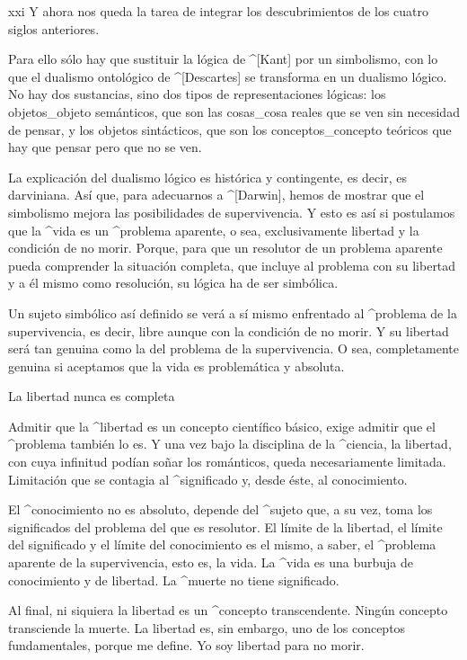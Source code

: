 \vfill\break

\siglo xxi Y ahora nos queda la tarea de integrar los
descubrimientos de los cuatro siglos anteriores.

\noindent
Para ello sólo hay que sustituir la lógica de ^[Kant] por un simbolismo,
con lo que el dualismo ontológico de ^[Descartes] se transforma en un
dualismo lógico. No hay dos sustancias, sino dos tipos de
representaciones lógicas: los objetos_{objeto} semánticos, que son las
cosas_{cosa} reales que se ven sin necesidad de pensar, y los objetos
sintácticos, que son los conceptos_{concepto} teóricos que hay que
pensar pero que no se ven.

La explicación del dualismo lógico es histórica y contingente, es decir,
es darviniana. Así que, para adecuarnos a ^[Darwin], hemos de mostrar
que el simbolismo mejora las posibilidades de supervivencia. Y esto es
así si postulamos que la ^{vida} es un ^{problema aparente}, o sea,
exclusivamente libertad y la condición de no morir. Porque, para que un
resolutor de un problema aparente pueda comprender la situación
completa, que incluye al problema con su libertad y a él mismo como
resolución, su lógica ha de ser simbólica.

Un sujeto simbólico así definido se verá a sí mismo enfrentado al
^{problema de la supervivencia}, es decir, libre aunque con la condición
de no morir. Y su libertad será tan genuina como la del problema de la
supervivencia. O sea, completamente genuina si aceptamos que la vida es
problemática y absoluta.


\Section La libertad nunca es completa

Admitir que la ^{libertad} es un concepto científico básico, exige
admitir que el ^{problema} también lo es. Y una vez bajo la disciplina
de la ^{ciencia}, la libertad, con cuya infinitud podían soñar los
románticos, queda necesariamente limitada. Limitación que se contagia al
^{significado} y, desde éste, al conocimiento.

El ^{conocimiento} no es absoluto, depende del ^{sujeto} que, a su vez,
toma los significados del problema del que es resolutor. El límite de la
libertad, el límite del significado y el límite del conocimiento es el
mismo, a saber, el ^{problema aparente} de la supervivencia, esto es, la
vida. La ^{vida} es una burbuja de conocimiento y de libertad. La
^{muerte} no tiene significado.

Al final, ni siquiera la libertad es un ^{concepto transcendente}.
Ningún concepto transciende la muerte. La libertad es, sin embargo, uno
de los conceptos fundamentales, porque me define. Yo soy libertad para
no morir.


